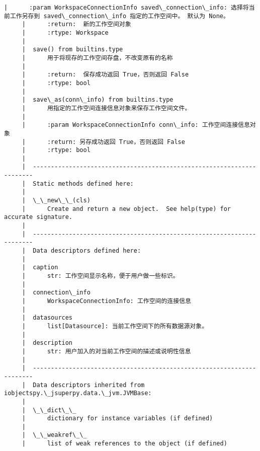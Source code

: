 \documentclass[11pt]{article}
\begin{document}
\begin{Verbatim}[commandchars=\\\{\}]
     |      :param WorkspaceConnectionInfo saved\_connection\_info: 选择将当前工作另存到 saved\_connection\_info 指定的工作空间中。 默认为 None。
     |      :return:  新的工作空间对象
     |      :rtype: Workspace
     |  
     |  save() from builtins.type
     |      用于将现存的工作空间存盘，不改变原有的名称
     |      
     |      :return:  保存成功返回 True，否则返回 False
     |      :rtype: bool
     |  
     |  save\_as(conn\_info) from builtins.type
     |      用指定的工作空间连接信息对象来保存工作空间文件。
     |      
     |      :param WorkspaceConnectionInfo conn\_info: 工作空间连接信息对象
     |      :return: 另存成功返回 True，否则返回 False
     |      :rtype: bool
     |  
     |  ----------------------------------------------------------------------
     |  Static methods defined here:
     |  
     |  \_\_new\_\_(cls)
     |      Create and return a new object.  See help(type) for accurate signature.
     |  
     |  ----------------------------------------------------------------------
     |  Data descriptors defined here:
     |  
     |  caption
     |      str: 工作空间显示名称，便于用户做一些标识。
     |  
     |  connection\_info
     |      WorkspaceConnectionInfo: 工作空间的连接信息
     |  
     |  datasources
     |      list[Datasource]: 当前工作空间下的所有数据源对象。
     |  
     |  description
     |      str: 用户加入的对当前工作空间的描述或说明性信息
     |  
     |  ----------------------------------------------------------------------
     |  Data descriptors inherited from iobjectspy.\_jsuperpy.data.\_jvm.JVMBase:
     |  
     |  \_\_dict\_\_
     |      dictionary for instance variables (if defined)
     |  
     |  \_\_weakref\_\_
     |      list of weak references to the object (if defined)
    

\end{Verbatim}
\end{document}
